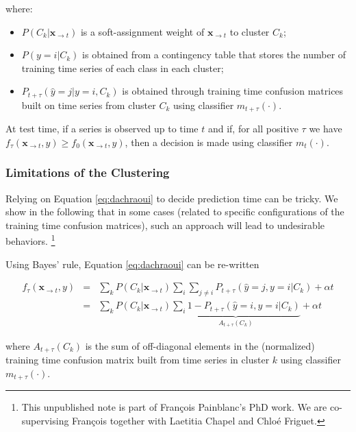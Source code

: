 where:

\begin{itemize}
\item $P(C_k | \mathbf{x}_{\rightarrow t})$ is a soft-assignment weight of
$\mathbf{x}_{\rightarrow t}$ to cluster $C_k$;
\item $P(y=i | C_k)$ is obtained from a contingency table that stores the number of
training time series of each class in each cluster;
\item $P_{t+\tau}(\hat{y} = j | y=i, C_k)$ is obtained through training time
confusion matrices built on time series from cluster $C_k$ using classifier
$m_{t+\tau}(\cdot)$.
\end{itemize}

At test time, if a series is observed up to time $t$ and if, for all positive
$\tau$ we have
$f_\tau(\mathbf{x}_{\rightarrow t}, y) \geq f_0(\mathbf{x}_{\rightarrow t}, y)$,
then a decision is made using classifier $m_t(\cdot)$.

\subsubsection{Limitations of the Clustering}

Relying on Equation \eqref{eq:dachraoui} to decide prediction time can be
tricky. We show in the following that in some cases (related to specific
configurations of the training time confusion matrices), such an approach will
lead to undesirable behaviors.%
\footnote{This unpublished note is part of François Painblanc's PhD work.
We are co-supervising François together with Laetitia Chapel and Chloé Friguet.}

Using Bayes' rule, Equation \eqref{eq:dachraoui} can be re-written

\begin{eqnarray}
    f_\tau(\mathbf{x}_{\rightarrow t}, y) &=&
        \sum_k P(C_k | \mathbf{x}_{\rightarrow t})
        \sum_i
        \sum_{j \neq i} P_{t+\tau}(\hat{y} = j, y=i | C_k)
        + \alpha t \\
    &=&
        \sum_k P(C_k | \mathbf{x}_{\rightarrow t})
        \underbrace{\sum_i 1 - P_{t+\tau}(\hat{y} = i, y=i | C_k)}_{A_{t+\tau}(C_k)}
        + \alpha t
\end{eqnarray}

where $A_{t+\tau}(C_k)$ is the sum of off-diagonal elements in the (normalized)
training time confusion matrix built from time series in cluster $k$ using
classifier $m_{t+\tau}(\cdot)$.

